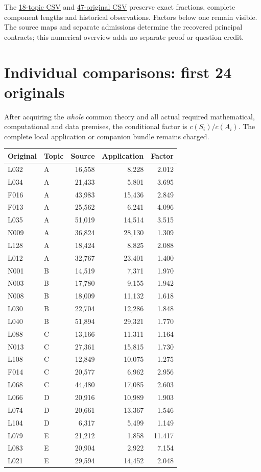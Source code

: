 \documentclass[11pt,a4paper]{article}
\begin{document}
The \href{topics.csv}{18-topic CSV} and \href{applications.csv}{47-original CSV} preserve exact fractions, complete component lengths and historical observations. Factors below one remain visible. The source maps and separate admissions determine the recovered principal contracts; this numerical overview adds no separate proof or question credit.
\newpage
\section*{Individual comparisons: first 24 originals}
After acquiring the \emph{whole} common theory and all actual required mathematical, computational and data premises, the conditional factor is $c(S_i)/c(A_i)$. The complete local application or companion bundle remains charged.
\begin{center}\small\begin{tabular}{llrrr}\toprule
Original & Topic & Source & Application & Factor\\\midrule
L032 & A & 16,558 & 8,228 & 2.012 \\
L034 & A & 21,433 & 5,801 & 3.695 \\
F016 & A & 43,983 & 15,436 & 2.849 \\
F013 & A & 25,562 & 6,241 & 4.096 \\
L035 & A & 51,019 & 14,514 & 3.515 \\
N009 & A & 36,824 & 28,130 & 1.309 \\
L128 & A & 18,424 & 8,825 & 2.088 \\
L012 & A & 32,767 & 23,401 & 1.400 \\
N001 & B & 14,519 & 7,371 & 1.970 \\
N003 & B & 17,780 & 9,155 & 1.942 \\
N008 & B & 18,009 & 11,132 & 1.618 \\
L030 & B & 22,704 & 12,286 & 1.848 \\
L040 & B & 51,894 & 29,321 & 1.770 \\
L088 & C & 13,166 & 11,311 & 1.164 \\
N013 & C & 27,361 & 15,815 & 1.730 \\
L108 & C & 12,849 & 10,075 & 1.275 \\
F014 & C & 20,577 & 6,962 & 2.956 \\
L068 & C & 44,480 & 17,085 & 2.603 \\
L066 & D & 20,916 & 10,989 & 1.903 \\
L074 & D & 20,661 & 13,367 & 1.546 \\
L104 & D & 6,317 & 5,499 & 1.149 \\
L079 & E & 21,212 & 1,858 & 11.417 \\
L083 & E & 20,904 & 2,922 & 7.154 \\
L021 & E & 29,594 & 14,452 & 2.048 \\\bottomrule\end{tabular}\end{center}
\end{document}
